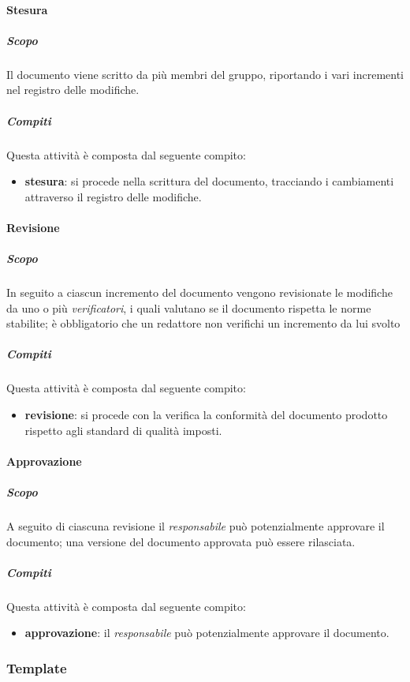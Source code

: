 \paragraph{Stesura}
\label{par:stesura}
\subparagraph{Scopo}
\label{par:stesura:scopo}
Il documento viene scritto da più membri del gruppo, riportando i vari incrementi nel registro delle modifiche.
\subparagraph{Compiti}
\label{par:stesura:compiti}
Questa attività è composta dal seguente compito:
\begin{itemize}
    \item \textbf{stesura}: si procede nella scrittura del documento, tracciando i cambiamenti attraverso il registro delle modifiche.
\end{itemize}

\paragraph{Revisione}
\label{par:revisione}
\subparagraph{Scopo}
\label{par:revizione:scopo}
In seguito a ciascun incremento del documento vengono revisionate le modifiche da uno o più \emph{verificatori}, i quali valutano se il documento rispetta le norme stabilite; è obbligatorio che un redattore non verifichi un incremento da lui svolto
\subparagraph{Compiti}
\label{par:revisione:compiti}
Questa attività è composta dal seguente compito:
\begin{itemize}
    \item \textbf{revisione}: si procede con la verifica la conformità del documento prodotto rispetto agli standard di qualità imposti.
\end{itemize}

\paragraph{Approvazione}
\label{par:approvazione}
\subparagraph{Scopo}
\label{par:approvazione:scopo}
A seguito di ciascuna revisione il \emph{responsabile} può potenzialmente approvare il documento; una versione del documento approvata può essere rilasciata.
\subparagraph{Compiti}
\label{par:approvazione:compiti}
Questa attività è composta dal seguente compito:
\begin{itemize}
    \item \textbf{approvazione}: il \emph{responsabile} può potenzialmente approvare il documento.
\end{itemize}


\subsubsection{Template}
\label{ssub:template}

